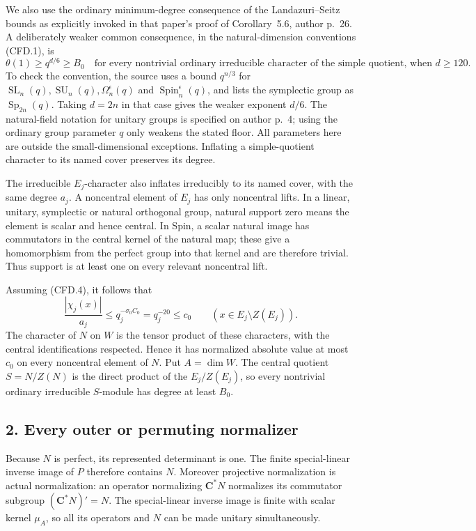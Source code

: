 We also use the ordinary minimum-degree consequence of the
Landazuri--Seitz bounds as explicitly invoked in that paper's proof
of Corollary~5.6, author p.~26. A deliberately weaker common
consequence, in the natural-dimension conventions (CFD.1), is
\[
 \theta(1)\ge q^{d/6}\ge B_0
 \quad\text{for every nontrivial ordinary irreducible character
 of the simple quotient, when }d\ge120.
 \tag{CFD.7}
\]
To check the convention, the source uses a bound $q^{n/3}$ for
$\operatorname{SL}_n(q),\operatorname{SU}_n(q),\Omega_n^\epsilon(q)$
and $\operatorname{Spin}_n^\epsilon(q)$, and lists the symplectic
group as $\operatorname{Sp}_{2n}(q)$. Taking $d=2n$ in that case
gives the weaker exponent $d/6$. The natural-field notation for
unitary groups is specified on author p.~4; using the ordinary
group parameter $q$ only weakens the stated floor. All parameters
here are outside the small-dimensional exceptions. Inflating a
simple-quotient character to its named cover preserves its degree.

The irreducible $E_j$-character also inflates irreducibly to its
named cover, with the same degree $a_j$. A noncentral element of
$E_j$ has only noncentral lifts. In a linear, unitary, symplectic or
natural orthogonal group, natural support zero means the element
is scalar and hence central. In Spin, a scalar natural image has
commutators in the central kernel of the natural map; these give a
homomorphism from the perfect group into that kernel and are
therefore trivial. Thus support is at least one on every relevant
noncentral lift.

Assuming (CFD.4), it follows that
\[
 \frac{|\chi_j(x)|}{a_j}
       \le q_j^{-\sigma_0 C_0}
       =q_j^{-20}\le c_0
       \qquad(x\in E_j\setminus Z(E_j)).
 \tag{CFD.8}
\]
The character of $N$ on $W$ is the tensor product of these
characters, with the central identifications respected. Hence it
has normalized absolute value at most $c_0$ on every noncentral
element of $N$. Put $A=\dim W$. The central quotient
$S=N/Z(N)$ is the direct product of the $E_j/Z(E_j)$, so every
nontrivial ordinary irreducible $S$-module has degree at least $B_0$.

\subsection*{2. Every outer or permuting normalizer}

Because $N$ is perfect, its represented determinant is one. The
finite special-linear inverse image of $P$ therefore contains $N$.
Moreover projective normalization is actual normalization: an
operator normalizing $\mathbf C^*N$ normalizes its commutator
subgroup $(\mathbf C^*N)'=N$. The special-linear inverse image is
finite with scalar kernel $\mu_A$, so all its operators and $N$
can be made unitary simultaneously.

